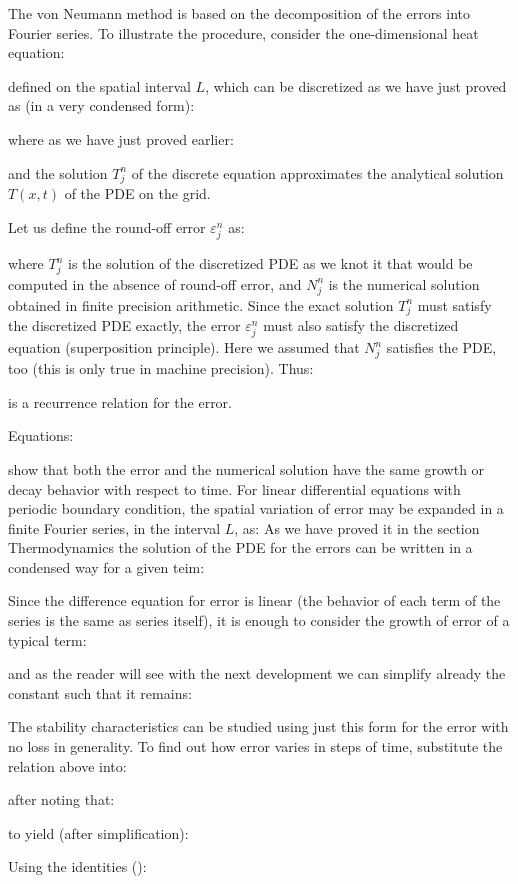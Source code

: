 	The von Neumann method is based on the decomposition of the errors into Fourier series. To illustrate the procedure, consider the one-dimensional heat equation:
	
	defined on the spatial interval $L$, which can be discretized as we have just proved as (in a very condensed form):
	
	where as we have just proved earlier:
	
	and the solution $T_j^n$ of the discrete equation approximates the analytical solution $T(x,t)$ of the PDE on the grid.
	
	Let us define the round-off error $\varepsilon_j^n$ as:
	
	where $T_j^n$ is the solution of the discretized PDE as we knot it that would be computed in the absence of round-off error, and $N_j^n$ is the numerical solution obtained in finite precision arithmetic. Since the exact solution $T_j^n$ must satisfy the discretized PDE exactly, the error $\varepsilon_j^n$ must also satisfy the discretized equation (superposition principle). Here we assumed that $N_j^n$ satisfies the PDE, too (this is only true in machine precision). Thus:
	
	is a recurrence relation for the error. 

	Equations:
	
	show that both the error and the numerical solution have the same growth or decay behavior with respect to time. For linear differential equations with periodic boundary condition, the spatial variation of error may be expanded in a finite Fourier series, in the interval $L$, as:
	As we have proved it in the section Thermodynamics the solution of the PDE for the errors can be written in a condensed way for a given teim:
	
	Since the difference equation for error is linear (the behavior of each term of the series is the same as series itself), it is enough to consider the growth of error of a typical term:
	
	and as the reader will see with the next development we can simplify already the constant such that it remains:
	
	The stability characteristics can be studied using just this form for the error with no loss in generality. To find out how error varies in steps of time, substitute the relation above into:
	
	after noting that:
	
	to yield (after simplification):
	
	Using the identities ():
	
